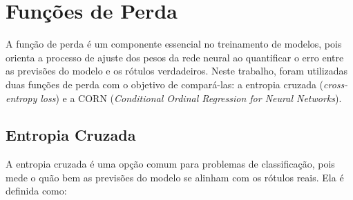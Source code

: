 


\section{Funções de Perda} \label{sec:funcoes-perda}

A função de perda é um componente essencial no treinamento de modelos, pois orienta a processo de ajuste dos pesos da rede neural ao quantificar o erro entre as previsões do modelo e os rótulos verdadeiros. Neste trabalho, foram utilizadas duas funções de perda com o objetivo de compará-las: a entropia cruzada (\textit{cross-entropy loss}) e a CORN (\textit{Conditional Ordinal Regression for Neural Networks}).

\subsection{Entropia Cruzada}

A entropia cruzada é uma opção comum para problemas de classificação, pois mede o quão bem as previsões do modelo se alinham com os rótulos reais. Ela é definida como:

